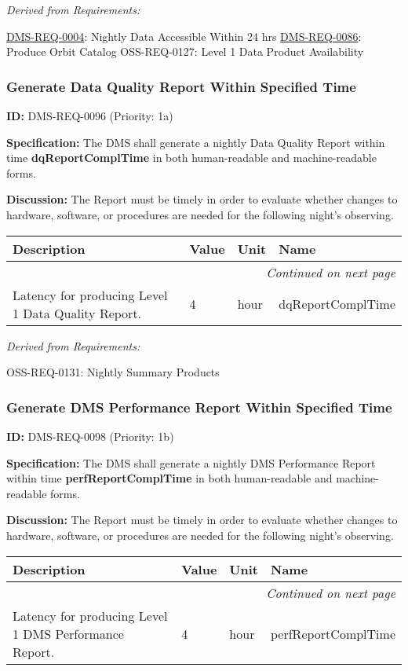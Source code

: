 \documentclass[SE,toc,lsstdraft]{lsstdoc}
\makeatletter
\newcommand{\paramname}[1]{\hspace{0pt}#1}
\newcommand{\unitname}[1]{\hspace{0pt}#1}
\newenvironment{parameters}[0]{%
\setlength\LTleft{0pt}
\setlength\LTright{\fill}
\begin{small}
\begin{longtable}[]{|p{0.49\textwidth}|l|p{0.6in}|p{1.70in}@{}|}

\hline \textbf{Description} & \textbf{Value} & \textbf{Unit} & \textbf{Name} \\ \hline
\endhead

\hline \multicolumn{4}{r}{\emph{Continued on next page}} \\
\endfoot

\hline\hline
\endlastfoot
}{%
\hline
\end{longtable}
\end{small}
}
\makeatother
\begin{document}
\emph{Derived from Requirements:}

\hyperref[DMS-REQ-0004]{DMS-REQ-0004}:
Nightly Data Accessible Within 24 hrs \newline
\hyperref[DMS-REQ-0086]{DMS-REQ-0086}:
Produce Orbit Catalog \newline
OSS-REQ-0127:
Level 1 Data Product Availability \newline

\subsubsection{Generate Data Quality Report Within Specified Time}

\label{DMS-REQ-0096}
\textbf{ID:} DMS-REQ-0096 (Priority: 1a)

\textbf{Specification:} The DMS shall generate a nightly Data Quality Report within time \textbf{dqReportComplTime }in both human-readable and machine-readable forms.

\textbf{Discussion:} The Report must be timely in order to evaluate whether changes to hardware, software, or procedures are needed for the following night's observing.

\begin{parameters}
Latency for producing Level 1 Data Quality Report.
&
4
&
\unitname{%
hour
}
&
\paramname{%
dqReportComplTime
} \\\hline
\end{parameters}

\emph{Derived from Requirements:}

OSS-REQ-0131:
Nightly Summary Products \newline

\subsubsection{Generate DMS Performance Report Within Specified Time}

\label{DMS-REQ-0098}
\textbf{ID:} DMS-REQ-0098 (Priority: 1b)

\textbf{Specification:} The DMS shall generate a nightly DMS Performance Report within time \textbf{perfReportComplTime }in both human-readable and machine-readable forms.

\textbf{Discussion:} The Report must be timely in order to evaluate whether changes to hardware, software, or procedures are needed for the following night's observing.

\begin{parameters}
Latency for producing Level 1 DMS Performance Report.
&
4
&
\unitname{%
hour
}
&
\paramname{%
perfReportComplTime
} \\\hline
\end{parameters}
\end{document}
